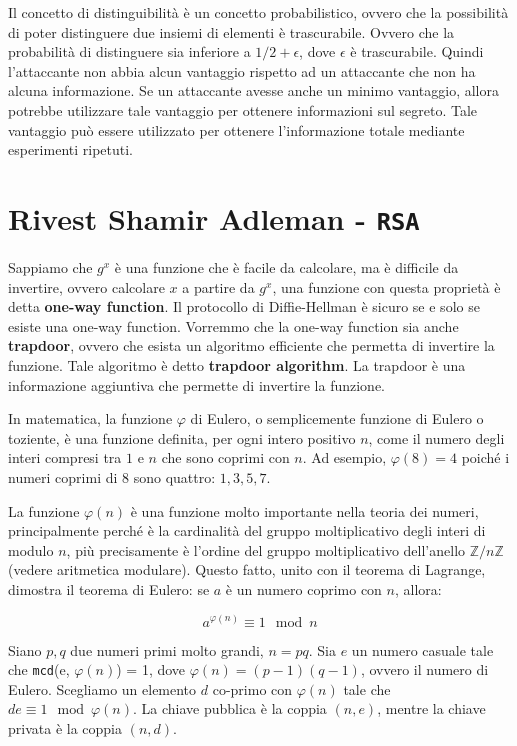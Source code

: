 Il concetto di distinguibilità è un concetto probabilistico, ovvero che la possibilità di poter 
distinguere due insiemi di elementi è trascurabile. Ovvero che la probabilità di distinguere 
sia inferiore a $1/2 + \epsilon$, dove $\epsilon$ è trascurabile. Quindi l'attaccante non abbia 
alcun vantaggio rispetto ad un attaccante che non ha alcuna informazione.
Se un attaccante avesse anche un minimo vantaggio, allora potrebbe utilizzare tale vantaggio per
ottenere informazioni sul segreto. Tale vantaggio può essere utilizzato per ottenere l'informazione 
totale mediante esperimenti ripetuti.

\section{Rivest Shamir Adleman - \texttt{RSA}}
Sappiamo che $g^x$ è una funzione che è facile da calcolare, ma è difficile da invertire, ovvero calcolare $x$
a partire da $g^x$, una funzione con questa proprietà è detta \textbf{one-way function}. Il protocollo di 
Diffie-Hellman è sicuro se e solo se esiste una one-way function.
Vorremmo che la one-way function sia anche \textbf{trapdoor}, ovvero che esista un algoritmo 
efficiente che permetta di invertire la funzione. Tale algoritmo è detto \textbf{trapdoor algorithm}.
La trapdoor è una informazione aggiuntiva che permette di invertire la funzione.

\begin{tcolorbox}[title = Funzione di Eulero $\varphi$]
  In matematica, la funzione \(\varphi\) di Eulero, o semplicemente funzione di Eulero
  o toziente, è una funzione definita, per ogni intero positivo \(n\), come il numero
  degli interi compresi tra $1$ e \(n\) che sono coprimi con \(n\). Ad esempio,
  \(\varphi(8) = 4\) poiché i numeri coprimi di $8$ sono quattro: $1, 3, 5, 7$.
  
  La funzione \(\varphi(n)\) è una funzione molto importante nella teoria dei numeri,
  principalmente perché è la cardinalità del gruppo moltiplicativo degli interi di
  modulo \(n\), più precisamente è l'ordine del gruppo moltiplicativo dell'anello
  \(\mathbb{Z}/n\mathbb{Z}\) (vedere aritmetica modulare). Questo fatto, unito con
  il teorema di Lagrange, dimostra il teorema di Eulero: se \(a\) è un numero coprimo
  con \(n\), allora:

  \[ a^{\varphi(n)} \equiv 1 \mod n \]

\end{tcolorbox}
Siano $p, q$ due numeri primi molto grandi, $n = pq$. Sia $e$ un numero casuale tale che 
\texttt{mcd}(e, $\varphi(n)$) = 1, dove $\varphi(n) = (p-1)(q-1)$, ovvero il numero di Eulero. Scegliamo 
un elemento $d$ co-primo con $\varphi(n)$ tale che $de \equiv 1 \mod \varphi(n)$.
La chiave pubblica è la coppia $(n, e)$, mentre la chiave privata è la coppia $(n, d)$.
